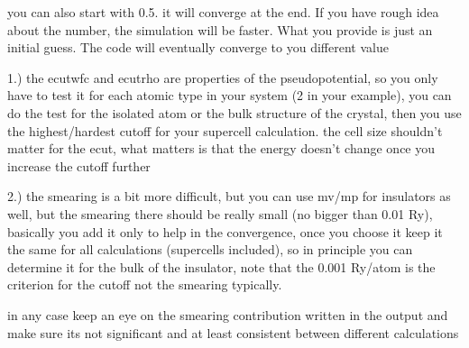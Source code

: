 
  you can also start with 0.5. it will converge at the end. If you have rough idea about the number, the simulation will be faster. What you provide is just an initial guess. The code will eventually converge to you different value


  1.) the ecutwfc and ecutrho are properties of the pseudopotential, so you only have to test it for each atomic type in your system (2 in your example), you can do the test for the isolated atom or the bulk structure of the crystal, then you use the highest/hardest cutoff for your supercell calculation. the cell size shouldn't matter for the ecut, what matters is that the energy doesn't change once you increase the cutoff further

  2.) the smearing is a bit more difficult, but you can use mv/mp for insulators as well, but the smearing there should be really small (no bigger than 0.01 Ry), basically you add it only to help in the convergence, once you choose it keep it the same for all calculations (supercells included), so in principle you can determine it for the bulk of the insulator, note that the 0.001 Ry/atom is the criterion for the cutoff not the smearing typically.

  in any case keep an eye on the smearing contribution written in the output and make sure its not significant and at least consistent between different calculations

